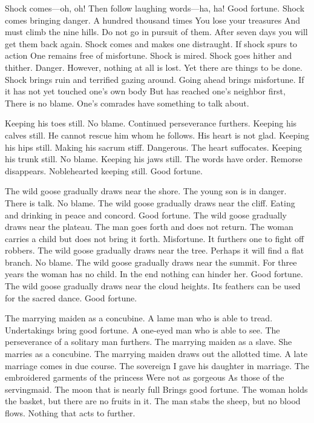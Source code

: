 {Shock comes—oh, oh!
 Then follow laughing words—ha, ha!
 Good fortune.}
{Shock comes bringing danger.
 A hundred thousand times
 You lose your treasures
 And must climb the nine hills.
 Do not go in pursuit of them.
 After seven days you will get them back again.}
{Shock comes and makes one distraught.
 If shock spurs to action
 One remains free of misfortune.}
{Shock is mired.}
{Shock goes hither and thither.
 Danger.
 However, nothing at all is lost.
 Yet there are things to be done.}
{Shock brings ruin and terrified gazing around.
 Going ahead brings misfortune.
 If it has not yet touched one’s own body
 But has reached one’s neighbor first,
 There is no blame.
 One’s comrades have something to talk about.}

{Keeping his toes still.
 No blame.
 Continued perseverance furthers.}
{Keeping his calves still.
 He cannot rescue him whom he follows.
 His heart is not glad.}
{Keeping his hips still.
 Making his sacrum stiff.
 Dangerous. The heart suffocates.}
{Keeping his trunk still.
 No blame.}
{Keeping his jaws still.
 The words have order.
 Remorse disappears.}
{Noblehearted keeping still.
 Good fortune.}

{The wild goose gradually draws near the shore.
 The young son is in danger.
 There is talk. No blame.}
{The wild goose gradually draws near the cliff.
 Eating and drinking in peace and concord.
 Good fortune.}
{The wild goose gradually draws near the plateau.
 The man goes forth and does not return.
 The woman carries a child but does not bring it forth.
 Misfortune.
 It furthers one to fight off robbers.}
{The wild goose gradually draws near the tree.
 Perhaps it will find a flat branch. No blame.}
{The wild goose gradually draws near the summit.
 For three years the woman has no child.
 In the end nothing can hinder her.
 Good fortune.}
{The wild goose gradually draws near the cloud heights.
 Its feathers can be used for the sacred dance.
 Good fortune.}

{The marrying maiden as a concubine.
 A lame man who is able to tread.
 Undertakings bring good fortune.}
{A one-eyed man who is able to see.
 The perseverance of a solitary man furthers.}
{The marrying maiden as a slave.
 She marries as a concubine.}
{The marrying maiden draws out the allotted time.
 A late marriage comes in due course.}
{The sovereign I gave his daughter in marriage.
 The embroidered garments of the princess
 Were not as gorgeous
 As those of the servingmaid.
 The moon that is nearly full
 Brings good fortune.}
{The woman holds the basket, but there are no fruits in it.
 The man stabs the sheep, but no blood flows.
 Nothing that acts to further.}

